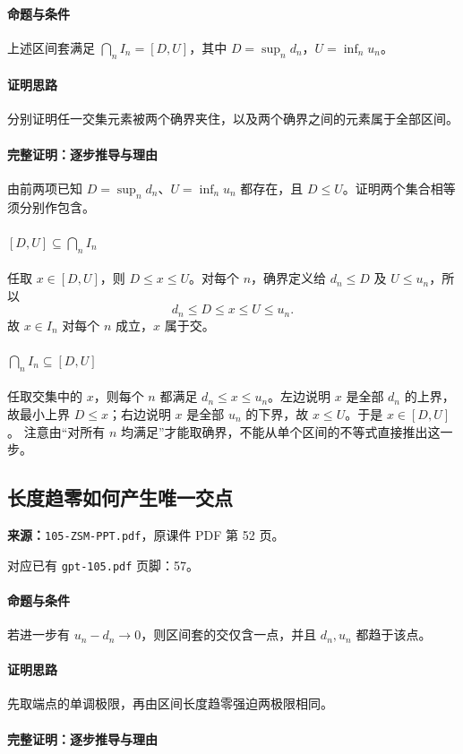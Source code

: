 \paragraph{命题与条件}上述区间套满足 $\bigcap_n I_n=[D,U]$，其中 $D=\sup_n d_n$，$U=\inf_n u_n$。
\paragraph{证明思路}分别证明任一交集元素被两个确界夹住，以及两个确界之间的元素属于全部区间。
\paragraph{完整证明：逐步推导与理由}

由前两项已知 $D=\sup_n d_n$、$U=\inf_n u_n$ 都存在，且 $D\le U$。证明两个集合相等须分别作包含。
\paragraph{$[D,U]\subseteq\bigcap_n I_n$}任取 $x\in[D,U]$，则 $D\le x\le U$。对每个 $n$，确界定义给 $d_n\le D$ 及 $U\le u_n$，所以
\[d_n\le D\le x\le U\le u_n.\]
故 $x\in I_n$ 对每个 $n$ 成立，$x$ 属于交。
\paragraph{$\bigcap_n I_n\subseteq[D,U]$}任取交集中的 $x$，则每个 $n$ 都满足 $d_n\le x\le u_n$。左边说明 $x$ 是全部 $d_n$ 的上界，故最小上界 $D\le x$；右边说明 $x$ 是全部 $u_n$ 的下界，故 $x\le U$。于是 $x\in[D,U]$。
注意由“对所有 $n$ 均满足”才能取确界，不能从单个区间的不等式直接推出这一步。

\clearpage\subsection{长度趋零如何产生唯一交点}
\textbf{来源：}\texttt{105-ZSM-PPT.pdf}，原课件 PDF 第 52 页。\par
对应已有 \texttt{gpt-105.pdf} 页脚：57。\par
\paragraph{命题与条件}若进一步有 $u_n-d_n\to0$，则区间套的交仅含一点，并且 $d_n,u_n$ 都趋于该点。
\paragraph{证明思路}先取端点的单调极限，再由区间长度趋零强迫两极限相同。
\paragraph{完整证明：逐步推导与理由}


